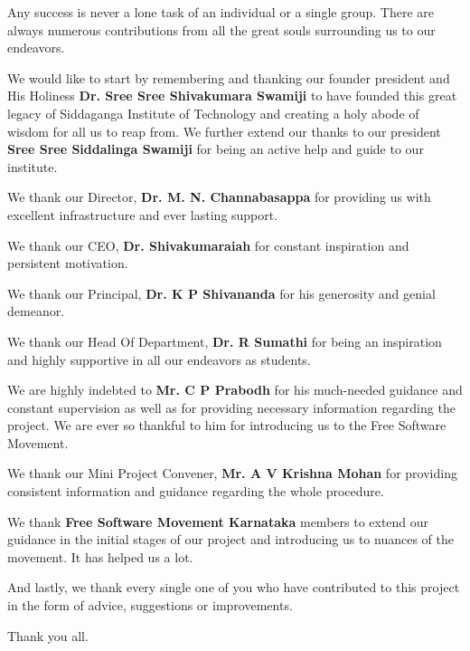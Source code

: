 \begin{acknowledgementslong}


Any success is never a lone task of an individual or a single group. There are always numerous contributions from all the great souls surrounding us to our endeavors.

We would like to start by remembering and thanking our founder president and His Holiness \textbf{Dr. Sree Sree Shivakumara Swamiji} to have founded this great legacy of Siddaganga Institute of Technology and creating a holy abode of wisdom for all us to reap from. We further extend our thanks to our president \textbf{Sree Sree Siddalinga Swamiji} for being an active help and guide to our institute.

We thank our Director, \textbf{Dr. M. N. Channabasappa} for providing us with excellent infrastructure and ever lasting support.

We thank our CEO, \textbf{Dr. Shivakumaraiah} for constant inspiration and persistent motivation.

We thank our Principal, \textbf{Dr. K P Shivananda} for his generosity and genial demeanor.

We thank our Head Of Department, \textbf{Dr. R Sumathi} for being an inspiration and highly supportive in all our endeavors as students.

We are highly indebted to \textbf{Mr. C P Prabodh} for his much-needed guidance and constant supervision as well as for providing necessary information regarding the project. We are ever so thankful to him for introducing us to the Free Software Movement.

We thank our Mini Project Convener, \textbf{Mr. A V Krishna Mohan} for providing consistent information and guidance regarding the whole procedure. 


We thank \textbf{Free Software Movement Karnataka} members to extend our guidance in the initial stages of our project and introducing us to nuances of the movement. It has helped us a lot.

And lastly, we thank every single one of you who have contributed to this project in the form of advice, suggestions or improvements.

Thank you all.

\end{acknowledgementslong}

